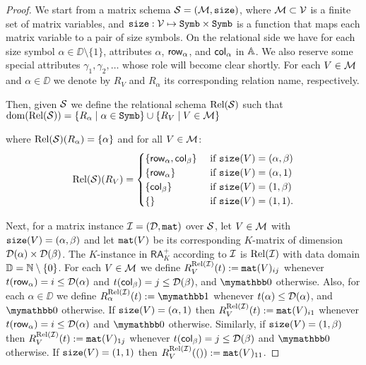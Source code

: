
\begin{proof}
We start from a matrix schema $\mathcal{S}=(\mathcal{M},\texttt{size})$, where $\mathcal{M}\subset \mathcal{V}$ is a finite set of matrix variables, 
and $\texttt{size}: \mathcal{V} \mapsto \texttt{Symb}\times \texttt{Symb}$ is a function that maps each matrix variable to a pair of size symbols. 
On the relational side we have for each size symbol $\alpha\in\DD\setminus\{1\}$, attributes $\alpha$, $\mathsf{row}_\alpha$, 
and $\mathsf{col}_\alpha$ in $\mathbb{A}$. We also reserve some special attributes $\gamma_1,\gamma_2,\ldots$ whose role will become clear shortly.
For each $V\in\mathcal{M}$ and $\alpha \in \DD$ we denote
by $R_V$ and $R_\alpha$ its corresponding relation name, respectively. 

Then, given $\mathcal{S}$ we define the relational 
schema $\text{Rel}(\mathcal{S})$ such that $\operatorname{dom}(\text{Rel}(\mathcal{S})) =  \{R_\alpha \mid \alpha\in\texttt{Symb}\} \cup \{R_V \mid V \in \mathcal{M}\}$

where $\text{Rel}(\mathcal{S})(R_\alpha) = \{\alpha\}$ and for all $V\in\mathcal{M}$:
\[
\text{Rel}(\mathcal{S})(R_V) = \begin{cases}
\lbrace\mathsf{row}_\alpha,\mathsf{col}_\beta \rbrace & \text{ if $ \texttt{size}(V)=(\alpha,\beta)$} \\
\lbrace\mathsf{row}_\alpha \rbrace & \text{ if $ \texttt{size}(V)=(\alpha,1)$} \\
\lbrace\mathsf{col}_\beta \rbrace  &
\text{ if $ \texttt{size}(V)=(1,\beta)$} \\
\lbrace\rbrace & \text{ if $\texttt{size}(V)=(1,1)$}.
\end{cases}
\]

Next, for a matrix instance $\mathcal{I} = (\mathcal{D},\texttt{mat})$ over $\mathcal{S}$,
let $V\in\mathcal{M}$ with $\texttt{size}(V)=(\alpha,\beta)$ and let $\texttt{mat}(V)$ be its corresponding $K$-matrix of dimension $\mathcal{D}(\alpha)\times \mathcal{D}(\beta)$.
The $K$-instance in $\mathsf{RA}_{K}^+$ according to $\mathcal{I}$ is $\text{Rel}(\mathcal{I})$ with data domain $\mathbb{D} = \mathbb{N} \setminus \{0\}$. For each $V\in\mathcal{M}$ we define 
$R_V^{\text{Rel}(\mathcal{I})}(t):=\texttt{mat}(V)_{ij}$ whenever $t(\mathsf{row}_\alpha) = i \leq \mathcal{D}(\alpha)$ and $t(\mathsf{col}_\beta) = j \leq \mathcal{D}(\beta)$, and $\kzero$ otherwise. 
Also, for each $\alpha \in \DD$ we define $R_\alpha^{\text{Rel}(\I)}(t):=\kone$ whenever $t(\alpha) \leq \mathcal{D}(\alpha)$, and $\kzero$ otherwise.
If $\texttt{size}(V)=(\alpha,1)$ then $R_V^{\text{Rel}(\mathcal{I})}(t):=\texttt{mat}(V)_{i1}$ whenever $t(\mathsf{row}_\alpha) = i \leq \mathcal{D}(\alpha)$ and $\kzero$ otherwise.
Similarly, if $\texttt{size}(V)=(1,\beta)$ then $R_V^{\text{Rel}(\mathcal{I})}(t):=\texttt{mat}(V)_{1j}$ whenever $t(\mathsf{col}_\beta) = j \leq \mathcal{D}(\beta)$ and $\kzero$ otherwise.
If $\texttt{size}(V)=(1,1)$ then $R_V^{\text{Rel}(\mathcal{I})}(()):=\texttt{mat}(V)_{11}$.



\end{proof}
